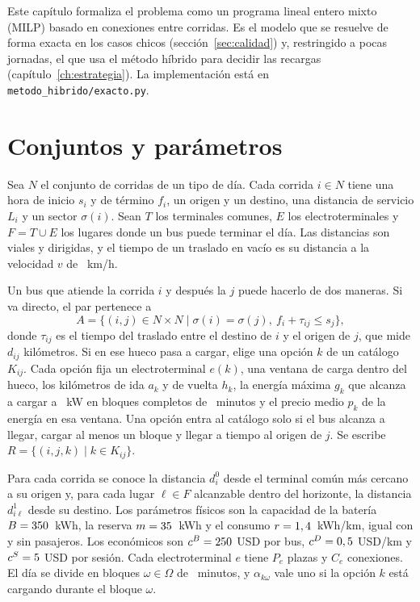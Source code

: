
Este capítulo formaliza el problema como un programa lineal entero mixto (MILP) basado en conexiones entre corridas. Es el modelo que se resuelve de forma exacta en los casos chicos (sección~\ref{sec:calidad}) y, restringido a pocas jornadas, el que usa el método híbrido para decidir las recargas (capítulo~\ref{ch:estrategia}). La implementación está en \texttt{metodo\_hibrido/exacto.py}.

\section{Conjuntos y parámetros}
\label{sec:conjuntos}

Sea \(N\) el conjunto de corridas de un tipo de día. Cada corrida \(i\in N\) tiene una hora de inicio \(s_i\) y de término \(f_i\), un origen y un destino, una distancia de servicio \(L_i\) y un sector \(\sigma(i)\). Sean \(T\) los terminales comunes, \(E\) los electroterminales y \(F=T\cup E\) los lugares donde un bus puede terminar el día. Las distancias son viales y dirigidas, y el tiempo de un traslado en vacío es su distancia a la velocidad \(v\) de \VelocidadVacio~km/h.

Un bus que atiende la corrida \(i\) y después la \(j\) puede hacerlo de dos maneras. Si va directo, el par pertenece a
\[
A=\{(i,j)\in N\times N \mid \sigma(i)=\sigma(j),\ f_i+\tau_{ij}\le s_j\},
\]
donde \(\tau_{ij}\) es el tiempo del traslado entre el destino de \(i\) y el origen de \(j\), que mide \(d_{ij}\) kilómetros. Si en ese hueco pasa a cargar, elige una opción \(k\) de un catálogo \(K_{ij}\). Cada opción fija un electroterminal \(e(k)\), una ventana de carga dentro del hueco, los kilómetros de ida \(a_k\) y de vuelta \(h_k\), la energía máxima \(g_k\) que alcanza a cargar a \Potencia~kW en bloques completos de \MinutosBloque~minutos y el precio medio \(p_k\) de la energía en esa ventana. Una opción entra al catálogo solo si el bus alcanza a llegar, cargar al menos un bloque y llegar a tiempo al origen de \(j\). Se escribe \(R=\{(i,j,k)\mid k\in K_{ij}\}\).

Para cada corrida se conoce la distancia \(d^{0}_i\) desde el terminal común más cercano a su origen y, para cada lugar \(\ell\in F\) alcanzable dentro del horizonte, la distancia \(d^{1}_{i\ell}\) desde su destino. Los parámetros físicos son la capacidad de la batería \(B=350\)~kWh, la reserva \(m=35\)~kWh y el consumo \(r=1,4\)~kWh/km, igual con y sin pasajeros. Los económicos son \(c^{B}=250\) USD por bus, \(c^{D}=0,5\) USD/km y \(c^{S}=5\) USD por sesión. Cada electroterminal \(e\) tiene \(P_e\) plazas y \(C_e\) conexiones. El día se divide en bloques \(\omega\in\Omega\) de \MinutosBloque~minutos, y \(\alpha_{k\omega}\) vale uno si la opción \(k\) está cargando durante el bloque \(\omega\).

